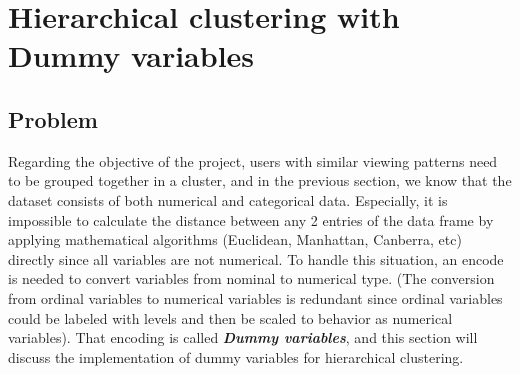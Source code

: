 \section{Hierarchical clustering with Dummy variables}




\subsection{Problem}
    Regarding the objective of the project, users with similar viewing patterns need to be grouped together in a cluster, and in the previous section, we know that the dataset consists of both numerical and categorical data. Especially, it is impossible to calculate the distance between any 2 entries of the data frame by applying mathematical algorithms (Euclidean, Manhattan, Canberra, etc) directly since all variables are not numerical. To handle this situation, an encode is needed to convert variables from nominal to numerical type. (The conversion from ordinal variables to numerical variables is redundant since ordinal variables could be labeled with levels and then be scaled to behavior as numerical variables). That encoding is called \textbf{\textit{Dummy variables}}, and this section will discuss the implementation of dummy variables for hierarchical clustering.

